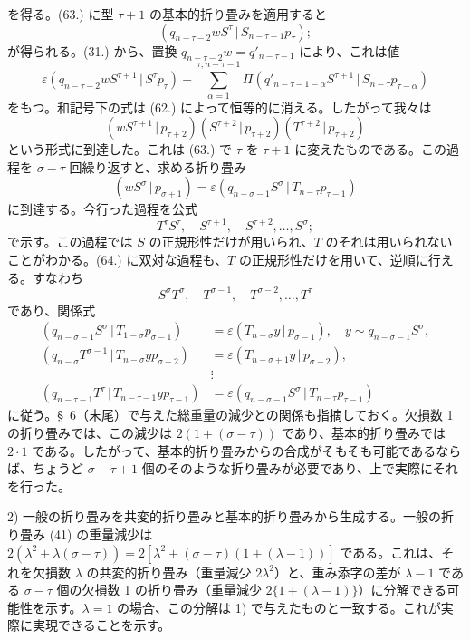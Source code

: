 \documentclass[11pt]{jlreq}
\newcommand{\pair}[2]{(#1\,|\,#2)}
\newcommand{\eps}{\varepsilon}
\begin{document}
を得る。(63.) に型 $\tau+1$ の基本的折り畳みを適用すると
\[
 \pair{q_{n-\tau-2}wS^\tau}{S_{n-\tau-1}p_\tau};
\]
が得られる。(31.) から、置換 $q_{n-\tau-2}w=q'_{n-\tau-1}$ により、これは値
\[
 \eps\pair{q_{n-\tau-2}wS^{\tau+1}}{S^\tau p_\tau}
 +\sum_{\alpha=1}^{\tau,n-\tau-1}\Pi\pair{q'_{n-\tau-1-\alpha}S^{\tau+1}}{S_{n-\tau}p_{\tau-\alpha}}
\]
をもつ。和記号下の式は (62.) によって恒等的に消える。したがって我々は
\[
 \pair{wS^{\tau+1}}{p_{\tau+2}}\pair{S^{\tau+2}}{p_{\tau+2}}\pair{T^{\tau+2}}{p_{\tau+2}}
\]
という形式に到達した。これは (63.) で $\tau$ を $\tau+1$ に変えたものである。この過程を $\sigma-\tau$ 回繰り返すと、求める折り畳み
\[
 \pair{wS^\sigma}{p_{\sigma+1}}=\eps\pair{q_{n-\sigma-1}S^\sigma}{T_{n-\tau}p_{\tau-1}}
\]
に到達する。今行った過程を公式
\begin{equation}
 T^\tau S^\tau,
\quad S^{\tau+1},\quad S^{\tau+2},\ldots,S^\sigma;
\tag{64}
\end{equation}
で示す。この過程では $S$ の正規形性だけが用いられ、$T$ のそれは用いられないことがわかる。(64.) に双対な過程も、$T$ の正規形性だけを用いて、逆順に行える。すなわち
\begin{equation}
 S^\sigma T^\sigma,
\quad T^{\sigma-1},\quad T^{\sigma-2},\ldots,T^\tau
\tag{65}
\end{equation}
であり、関係式
\begin{align*}
\pair{q_{n-\sigma-1}S^\sigma}{T_{1-\sigma}p_{\sigma-1}}&=\eps\pair{T_{n-\sigma}y}{p_{\sigma-1}},\quad y\sim q_{n-\sigma-1}S^\sigma,\\
\pair{q_{n-\sigma}T^{\sigma-1}}{T_{n-\sigma}yp_{\sigma-2}}&=\eps\pair{T_{n-\sigma+1}y}{p_{\sigma-2}},\\
&\vdots\\
\pair{q_{n-\tau-1}T^\tau}{T_{n-\tau-1}yp_{\tau-1}}&=\eps\pair{q_{n-\sigma-1}S^\sigma}{T_{n-\tau}p_{\tau-1}}
\end{align*}
に従う。\S\ 6（末尾）で与えた総重量の減少との関係も指摘しておく。欠損数 1 の折り畳みでは、この減少は $2(1+(\sigma-\tau))$ であり、基本的折り畳みでは $2\cdot1$ である。したがって、基本的折り畳みからの合成がそもそも可能であるならば、ちょうど $\sigma-\tau+1$ 個のそのような折り畳みが必要であり、上で実際にそれを行った。

2) 一般の折り畳みを共変的折り畳みと基本的折り畳みから生成する。一般の折り畳み (41) の重量減少は $2(\lambda^2+\lambda(\sigma-\tau))=2[\lambda^2+(\sigma-\tau)(1+(\lambda-1))]$ である。これは、それを欠損数 $\lambda$ の共変的折り畳み（重量減少 $2\lambda^2$）と、重み添字の差が $\lambda-1$ である $\sigma-\tau$ 個の欠損数 1 の折り畳み（重量減少 $2\{1+(\lambda-1)\}$）に分解できる可能性を示す。$\lambda=1$ の場合、この分解は 1) で与えたものと一致する。これが実際に実現できることを示す。
\end{document}
